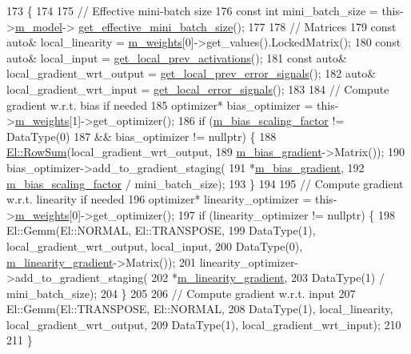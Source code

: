 \begin{DoxyCode}
173                                                                      \{
174 
175   \textcolor{comment}{// Effective mini-batch size}
176   \textcolor{keyword}{const} \textcolor{keywordtype}{int} mini\_batch\_size = this->\hyperlink{classlbann_1_1Layer_a3d9315e99574166f2f33e37b572021d2}{m\_model}->
      \hyperlink{classlbann_1_1model_a2a9b4cfa1c8c91e4131908751f9c4a6a}{get\_effective\_mini\_batch\_size}();
177 
178   \textcolor{comment}{// Matrices}
179   \textcolor{keyword}{const} \textcolor{keyword}{auto}& local\_linearity = \hyperlink{classlbann_1_1Layer_a7954e30fbf9100a6ba4b56d02767a469}{m\_weights}[0]->get\_values().LockedMatrix();
180   \textcolor{keyword}{const} \textcolor{keyword}{auto}& local\_input = \hyperlink{classlbann_1_1Layer_a35397843bb0c84030000c7d872229acb}{get\_local\_prev\_activations}();
181   \textcolor{keyword}{const} \textcolor{keyword}{auto}& local\_gradient\_wrt\_output = \hyperlink{classlbann_1_1Layer_a82827edc5e869960144f3ccb2172bfcd}{get\_local\_prev\_error\_signals}();
182   \textcolor{keyword}{auto}& local\_gradient\_wrt\_input = \hyperlink{classlbann_1_1Layer_af178d00b9d878aa7d87754bff2a91f3a}{get\_local\_error\_signals}();
183 
184   \textcolor{comment}{// Compute gradient w.r.t. bias if needed}
185   optimizer* bias\_optimizer = this->\hyperlink{classlbann_1_1Layer_a7954e30fbf9100a6ba4b56d02767a469}{m\_weights}[1]->get\_optimizer();
186   \textcolor{keywordflow}{if} (\hyperlink{classlbann_1_1fully__connected__layer_ae02eaffd5528bf572883f8b06d1b40c0}{m\_bias\_scaling\_factor} != DataType(0)
187       && bias\_optimizer != \textcolor{keyword}{nullptr}) \{
188     \hyperlink{namespaceEl_a584f088a3325a8222d4d6ac37be04b04}{El::RowSum}(local\_gradient\_wrt\_output,
189                \hyperlink{classlbann_1_1fully__connected__layer_a6510917c573378f40789a1d16db22b4e}{m\_bias\_gradient}->Matrix());
190     bias\_optimizer->add\_to\_gradient\_staging(
191       *\hyperlink{classlbann_1_1fully__connected__layer_a6510917c573378f40789a1d16db22b4e}{m\_bias\_gradient},
192       \hyperlink{classlbann_1_1fully__connected__layer_ae02eaffd5528bf572883f8b06d1b40c0}{m\_bias\_scaling\_factor} / mini\_batch\_size);
193   \}
194 
195   \textcolor{comment}{// Compute gradient w.r.t. linearity if needed}
196   optimizer* linearity\_optimizer = this->\hyperlink{classlbann_1_1Layer_a7954e30fbf9100a6ba4b56d02767a469}{m\_weights}[0]->get\_optimizer();
197   \textcolor{keywordflow}{if} (linearity\_optimizer != \textcolor{keyword}{nullptr}) \{
198     El::Gemm(El::NORMAL, El::TRANSPOSE,
199              DataType(1), local\_gradient\_wrt\_output, local\_input,
200              DataType(0), \hyperlink{classlbann_1_1fully__connected__layer_ab80f9cb94662ce4d90aa6d8b5cfa0803}{m\_linearity\_gradient}->Matrix());
201     linearity\_optimizer->add\_to\_gradient\_staging(
202       *\hyperlink{classlbann_1_1fully__connected__layer_ab80f9cb94662ce4d90aa6d8b5cfa0803}{m\_linearity\_gradient},
203       DataType(1) / mini\_batch\_size);
204   \}
205 
206   \textcolor{comment}{// Compute gradient w.r.t. input}
207   El::Gemm(El::TRANSPOSE, El::NORMAL,
208            DataType(1), local\_linearity, local\_gradient\_wrt\_output,
209            DataType(1), local\_gradient\_wrt\_input);
210 
211 \}
\end{DoxyCode}
